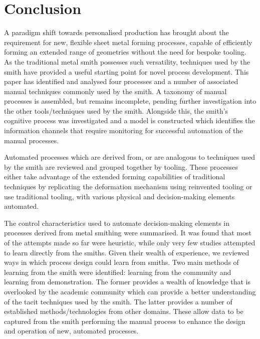 

\section{Conclusion}

A paradigm shift towards personalised production has brought about the requirement for new, flexible sheet metal forming processes, capable of efficiently forming an extended range of geometries without the need for bespoke tooling. As the traditional metal smith possesses such versatility, techniques used by the smith have provided a useful starting point for novel process development.  This paper has identified and analysed four processes and a number of associated manual techniques commonly used by the smith. A taxonomy of manual processes is assembled, but remains incomplete, pending further investigation into the other tools/techniques used by the smith. Alongside this, the smith’s cognitive process was investigated and a model is constructed which identifies the information channels that require monitoring for successful automation of the manual processes.

Automated processes which are derived from, or are analogous to techniques used by the smith are reviewed and grouped together by tooling. These processes either take advantage of the extended forming capabilities of traditional techniques by replicating the deformation mechanism using reinvented tooling or use traditional tooling, with various physical and decision-making elements automated. 

The control characteristics used to automate decision-making elements in processes derived from metal smithing were summarised. It was found that most of the attempts made so far were heuristic, while only very few studies attempted to learn directly from the smiths. Given their wealth of experience, we reviewed ways in which process design could learn from smiths. Two main methods of learning from the smith were identified: learning from the community and learning from demonstration. The former provides a wealth of knowledge that is overlooked by the academic community which can provide a better understanding of the tacit techniques used by the smith. The latter provides a number of established methods/technologies from other domains. These allow data to be captured from the smith performing the manual process to enhance the design and operation of new, automated processes.



